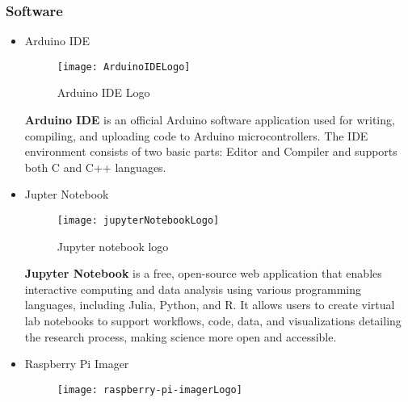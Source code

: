 \subsubsection{Software}
\begin{itemize}
  \item Arduino IDE
\FloatBarrier
\begin{figure}[h]
         \centering
        \texttt{[image: ArduinoIDELogo]}
   
        \caption{Arduino IDE Logo}
        \label{fig:ArduinoIDELogo}
    \end{figure}
\FloatBarrier
\subitem\textbf{Arduino IDE} is an official Arduino software application used for writing, compiling, and uploading code to Arduino microcontrollers. The IDE environment consists of two basic parts: Editor and Compiler and supports both C and C++ languages.\cite{MA18}

   
  \item Jupter Notebook
\begin{figure}[h]
         \centering
        \texttt{[image: jupyterNotebookLogo]}
   
        \caption{Jupyter notebook logo}
        \label{fig:Jupyter notebook logo}
    \end{figure}
\FloatBarrier
\subitem\textbf{Jupyter Notebook} is a free, open-source web application that enables interactive computing and data analysis using various programming languages, including Julia, Python, and R.\cite{BMIPC17}
\subitem It allows users to create virtual lab notebooks to support workflows, code, data, and visualizations detailing the research process, making science more open and accessible.\cite{BMIPC17}
  \item Raspberry Pi Imager
\begin{figure}[h]
       \centering
        \texttt{[image: raspberry-pi-imagerLogo]}
   

\end{figure}
\end{itemize}

